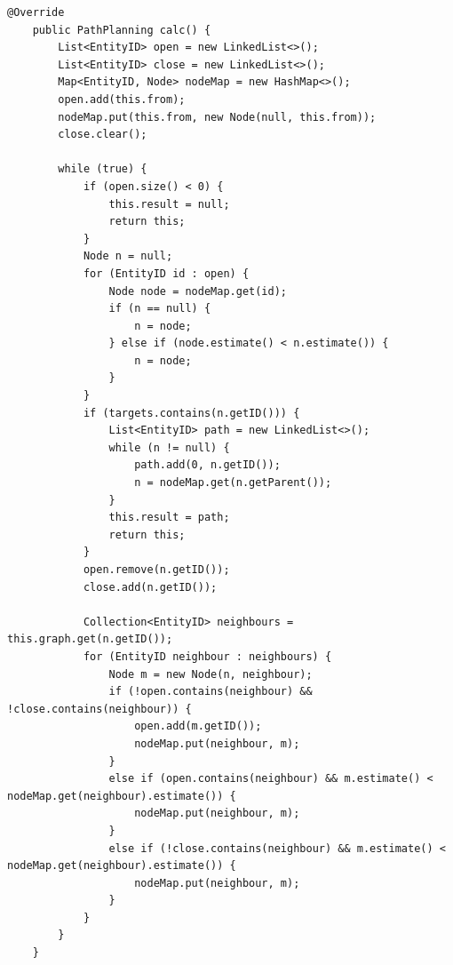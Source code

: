 \documentclass[a4paper]{article}
\begin{document}
\begin{lstlisting}[caption=calc(),label=astarpathplan2]
    @Override
    public PathPlanning calc() {
        List<EntityID> open = new LinkedList<>();
        List<EntityID> close = new LinkedList<>();
        Map<EntityID, Node> nodeMap = new HashMap<>();
        open.add(this.from);
        nodeMap.put(this.from, new Node(null, this.from));
        close.clear();

        while (true) {
            if (open.size() < 0) {
                this.result = null;
                return this;
            }
            Node n = null;
            for (EntityID id : open) {
                Node node = nodeMap.get(id);
                if (n == null) {
                    n = node;
                } else if (node.estimate() < n.estimate()) {
                    n = node;
                }
            }
            if (targets.contains(n.getID())) {
                List<EntityID> path = new LinkedList<>();
                while (n != null) {
                    path.add(0, n.getID());
                    n = nodeMap.get(n.getParent());
                }
                this.result = path;
                return this;
            }
            open.remove(n.getID());
            close.add(n.getID());

            Collection<EntityID> neighbours = this.graph.get(n.getID());
            for (EntityID neighbour : neighbours) {
                Node m = new Node(n, neighbour);
                if (!open.contains(neighbour) && !close.contains(neighbour)) {
                    open.add(m.getID());
                    nodeMap.put(neighbour, m);
                }
                else if (open.contains(neighbour) && m.estimate() < nodeMap.get(neighbour).estimate()) {
                    nodeMap.put(neighbour, m);
                }
                else if (!close.contains(neighbour) && m.estimate() < nodeMap.get(neighbour).estimate()) {
                    nodeMap.put(neighbour, m);
                }
            }
        }
    }
\end{lstlisting}
\end{document}
